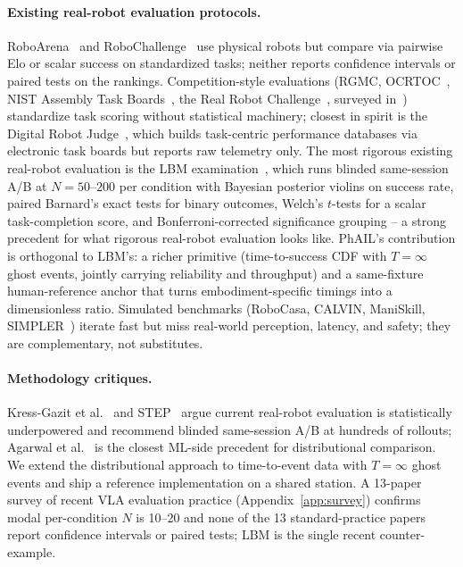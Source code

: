 \documentclass{article}
\begin{document}
\paragraph{Existing real-robot evaluation protocols.} RoboArena~\cite{roboarena} and RoboChallenge~\cite{robochallenge} use physical robots but compare via pairwise Elo or scalar success on standardized tasks; neither reports confidence intervals or paired tests on the rankings. Competition-style evaluations (RGMC, OCRTOC~\cite{ocrtoc}, NIST Assembly Task Boards~\cite{nist_atb}, the Real Robot Challenge~\cite{realrobotchallenge}, surveyed in~\cite{sun_competitions_2022}) standardize task scoring without statistical machinery; closest in spirit is the Digital Robot Judge~\cite{so2023}, which builds task-centric performance databases via electronic task boards but reports raw telemetry only. The most rigorous existing real-robot evaluation is the LBM examination~\cite{lbm2026}, which runs blinded same-session A/B at $N{=}50$--$200$ per condition with Bayesian posterior violins on success rate, paired Barnard's exact tests for binary outcomes, Welch's $t$-tests for a scalar task-completion score, and Bonferroni-corrected significance grouping -- a strong precedent for what rigorous real-robot evaluation looks like. PhAIL's contribution is orthogonal to LBM's: a richer primitive (time-to-success CDF with $T{=}\infty$ ghost events, jointly carrying reliability and throughput) and a same-fixture human-reference anchor that turns embodiment-specific timings into a dimensionless ratio. Simulated benchmarks (RoboCasa, CALVIN, ManiSkill, SIMPLER~\cite{robocasa,calvin,maniskill,simpler}) iterate fast but miss real-world perception, latency, and safety; they are complementary, not substitutes.

\paragraph{Methodology critiques.} Kress-Gazit et al.~\cite{kress2024} and STEP~\cite{snyder2025} argue current real-robot evaluation is statistically underpowered and recommend blinded same-session A/B at hundreds of rollouts; Agarwal et al.~\cite{agarwal2021} is the closest ML-side precedent for distributional comparison. We extend the distributional approach to time-to-event data with $T{=}\infty$ ghost events and ship a reference implementation on a shared station. A 13-paper survey of recent VLA evaluation practice (Appendix~\ref{app:survey}) confirms modal per-condition $N$ is 10--20 and none of the 13 standard-practice papers report confidence intervals or paired tests; LBM is the single recent counter-example.
\end{document}

